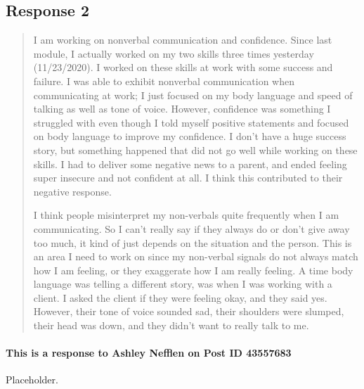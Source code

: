
\subsection{Response 2}
  \begin{quotation}
    I am working on nonverbal communication and confidence. Since last module,
      I actually worked on my two skills three times yesterday (11/23/2020). I
      worked on these skills at work with some success and failure. I was able
      to exhibit nonverbal communication when communicating at work; I just
      focused on my body language and speed of talking as well as tone of voice.
      However, confidence was something I struggled with even though I told
      myself positive statements and focused on body language to improve my
      confidence. I don’t have a huge success story, but something happened
      that did not go well while working on these skills. I had to deliver some
      negative news to a parent, and ended feeling super insecure and not
      confident at all. I think this contributed to their negative response.

    I think people misinterpret my non-verbals quite frequently when I am
      communicating. So I can’t really say if they always do or don’t give away
      too much, it kind of just depends on the situation and the person. This
      is an area I need to work on since my non-verbal signals do not always
      match how I am feeling, or they exaggerate how I am really feeling. A time
      body language was telling a different story, was when I was working with a
      client. I asked the client if they were feeling okay, and they said yes.
      However, their tone of voice sounded sad, their shoulders were slumped,
      their head was down, and they didn’t want to really talk to me.
  \end{quotation}

  \paragraph{This is a response to Ashley Nefflen on Post ID 43557683}
    Placeholder.
